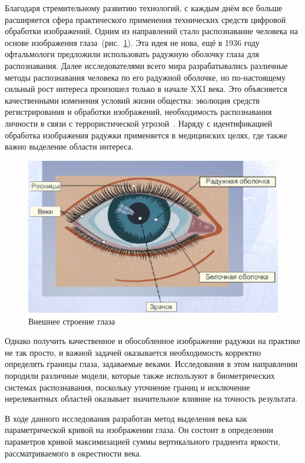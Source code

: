 \documentclass[12pt,a4paper]{article} %
\begin{document}
Благодаря стремительному развитию технологий, с каждым днём все больше расширяется сфера практического применения технических средств цифровой обработки изображений. Одним из направлений стало распознавание человека на основе изображения глаза~(рис.~\ref{fig:glaz}). Эта идея не нова, ещё в 1936 году офтальмологи \cite{Medic} предложили использовать радужную оболочку глаза для распознавания. Далее исследователями всего мира разрабатывались различные методы распознавания человека по его радужной оболочке, но по-настоящему сильный рост интереса произошел только в начале XXI века. Это объясняется качественными изменения условий жизни общества: эволюция средств регистрирования и обработки изображений, необходимость распознавания личности в связи с террористической угрозой~\cite{Conf3, Terr, Tech}. Наряду с идентификацией обработка изображения радужки применяется в медицинских целях, где также важно выделение области интереса. 

\begin{figure}[h]
	
	\centering
	
	\includegraphics[width=0.6\linewidth]{glaz.jpg}
	
	\caption{Внешнее строение глаза}
	
	\label{fig:glaz}
	
\end{figure}

Однако получить качественное и обособленное изображение радужки на практике не так просто, и важной задачей оказывается необходимость корректно определять границы глаза, задаваемые веками. Исследования в этом направлении породили различные модели, которые также используют в биометрических системах распознавания, поскольку уточнение границ и исключение нерелевантных областей оказывает значительное влияние на точность результата.

В ходе данного исследования разработан метод выделения века как параметрической кривой на изображении глаза. Он состоит в определении параметров кривой максимизацией суммы вертикального градиента яркости, рассматриваемого в окрестности века.
 
\end{document}
